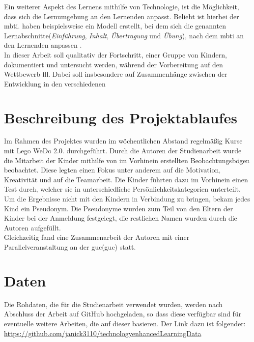 Ein weiterer Aspekt des Lernens mithilfe von Technologie, ist die Möglichkeit, dass sich die Lernumgebung an den Lernenden anpasst. Beliebt ist hierbei der \acrlong{mbti}. \citeauthor{yel_adaptive_2018} haben beispielsweise ein Modell erstellt, bei dem sich die genannten Lernabschnitte(\textit{Einführung}, \textit{Inhalt}, \textit{Übertragung} und \textit{Übung}), nach dem \acrshort{mbti} an den Lernenden anpassen \cite{yel_adaptive_2018}.\\
In dieser Arbeit soll qualitativ der Fortschritt, einer Gruppe von Kindern, dokumentiert und untersucht werden, während der Vorbereitung auf den Wettbewerb \acrlong{fll}. Dabei soll insbesondere auf Zusammenhänge zwischen der Entwicklung in den verschiedenen 



\section{Beschreibung des Projektablaufes}
Im Rahmen des Projektes wurden im wöchentlichen Abstand regelmäßig Kurse mit Lego WeDo 2.0. durchgeführt. Durch die Autoren der Studienarbeit wurde die Mitarbeit der Kinder mithilfe von im Vorhinein erstellten Beobachtungsbögen beobachtet. Diese legten einen Fokus unter anderem auf die Motivation, Kreativität und auf die Teamarbeit. Die Kinder führten dazu im Vorhinein einen Test durch, welcher sie in unterschiedliche Persönlichkeitskategorien unterteilt. Um die Ergebnisse nicht mit den Kindern in Verbindung zu bringen, bekam jedes Kind ein Pseudonym. Die Pseudonyme wurden zum Teil von den Eltern der Kinder bei der Anmeldung festgelegt, die restlichen Namen wurden durch die Autoren aufgefüllt.\\
Gleichzeitig fand eine Zusammenarbeit der Autoren mit einer Parallelveranstaltung an der \acrlong{guc}(\acrshort{guc}) statt.\\


\section{Daten}
Die Rohdaten, die für die Studienarbeit verwendet wurden, werden nach Abschluss der Arbeit auf GitHub hochgeladen, so dass diese verfügbar sind für eventuelle weitere Arbeiten, die auf dieser basieren. Der Link dazu ist folgender: \url{https://github.com/janick3110/technologyenhancedLearningData}
